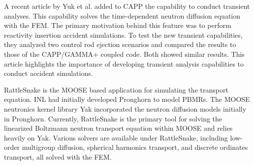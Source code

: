 A recent article by Yuk et al. \cite{yuk_time-dependent_2020} added to CAPP the capability to conduct transient analyses.
This capability solves the time-dependent neutron diffusion equation with the \gls{FEM}.
The primary motivation behind this feature was to perform reactivity insertion accident simulations.
To test the new transient capabilities, they analyzed two control rod ejection scenarios and compared the results to those of the CAPP/GAMMA+ coupled code.
Both showed similar results.
This article highlights the importance of developing transient analysis capabilities to conduct accident simulations.

RattleSnake \cite{wang_rattlesnake_2019} is the MOOSE \cite{gaston_moose_2009} based application for simulating the transport equation.
\gls{INL} had initially developed Pronghorn \cite{strydom_inl_2013} to model \glspl{PBMR}.
The MOOSE neutronics kernel library Yak incorporated the neutron diffusion models initially in Pronghorn.
Currently, RattleSnake is the primary tool for solving the linearized Boltzmann neutron transport equation within MOOSE and relies heavily on Yak.
Various solvers are available under RattleSnake, including low-order multigroup diffusion, spherical harmonics transport, and discrete ordinates transport, all solved with the \gls{FEM}.

